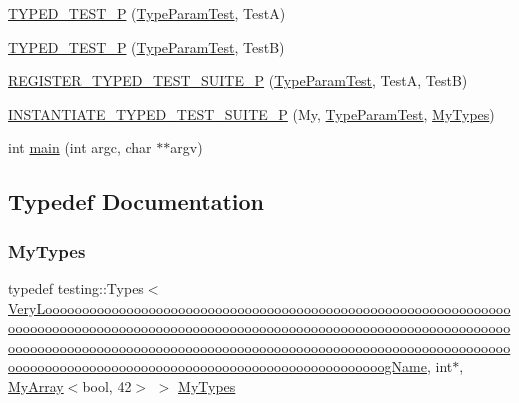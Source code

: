\begin{DoxyCompactItemize}
\item 
\mbox{\hyperlink{googletest-master_2googletest_2test_2googletest-list-tests-unittest___8cc_aadd51dfff9d63b5e0faa0130697684c1}{T\+Y\+P\+E\+D\+\_\+\+T\+E\+S\+T\+\_\+P}} (\mbox{\hyperlink{class_type_param_test}{Type\+Param\+Test}}, TestA)
\item 
\mbox{\hyperlink{googletest-master_2googletest_2test_2googletest-list-tests-unittest___8cc_a667494b5b0e4418064679f58c546db97}{T\+Y\+P\+E\+D\+\_\+\+T\+E\+S\+T\+\_\+P}} (\mbox{\hyperlink{class_type_param_test}{Type\+Param\+Test}}, TestB)
\item 
\mbox{\hyperlink{googletest-master_2googletest_2test_2googletest-list-tests-unittest___8cc_a24c35f734ffc5235cc3881d22717d506}{R\+E\+G\+I\+S\+T\+E\+R\+\_\+\+T\+Y\+P\+E\+D\+\_\+\+T\+E\+S\+T\+\_\+\+S\+U\+I\+T\+E\+\_\+P}} (\mbox{\hyperlink{class_type_param_test}{Type\+Param\+Test}}, TestA, TestB)
\item 
\mbox{\hyperlink{googletest-master_2googletest_2test_2googletest-list-tests-unittest___8cc_afbb047642153cc08001200d1c24f278a}{I\+N\+S\+T\+A\+N\+T\+I\+A\+T\+E\+\_\+\+T\+Y\+P\+E\+D\+\_\+\+T\+E\+S\+T\+\_\+\+S\+U\+I\+T\+E\+\_\+P}} (My, \mbox{\hyperlink{class_type_param_test}{Type\+Param\+Test}}, \mbox{\hyperlink{googletest-master_2googletest_2test_2googletest-list-tests-unittest___8cc_a16f58cd49c18568802322bbaf9f3f654}{My\+Types}})
\item 
int \mbox{\hyperlink{googletest-master_2googletest_2test_2googletest-list-tests-unittest___8cc_a3c04138a5bfe5d72780bb7e82a18e627}{main}} (int argc, char $\ast$$\ast$argv)
\end{DoxyCompactItemize}


\subsection{Typedef Documentation}
\mbox{\label{googletest-master_2googletest_2test_2googletest-list-tests-unittest___8cc_a16f58cd49c18568802322bbaf9f3f654}} 
\subsubsection{\texorpdfstring{MyTypes}{MyTypes}}
{\footnotesize\ttfamily typedef testing\+::\+Types$<$\mbox{\hyperlink{class_very_loooooooooooooooooooooooooooooooooooooooooooooooooooooooooooooooooooooooooooooooooooo570db76e21fa868abfe0f6323a68c9ba}{Very\+Loooooooooooooooooooooooooooooooooooooooooooooooooooooooooooooooooooooooooooooooooooooooooooooooooooooooooooooooooooooooooooooooooooooooooooooooooooooooooooooooooooooooooooooooooooooooooooooooooooooooooooooooooooooooooooooooooooooooooooooooooooooooooog\+Name}}, int$\ast$, \mbox{\hyperlink{class_my_array}{My\+Array}}$<$bool, 42$>$ $>$ \mbox{\hyperlink{googletest-master_2googletest_2test_2googletest-list-tests-unittest___8cc_a16f58cd49c18568802322bbaf9f3f654}{My\+Types}}}



